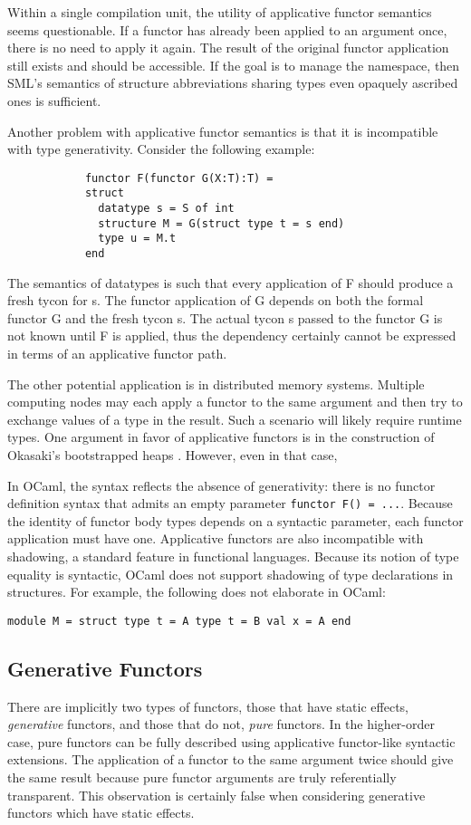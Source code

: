 Within a single compilation unit, the utility of applicative functor semantics seems questionable. If a functor has already been applied to an argument once, there is no need to apply it again. The result of the original functor application still exists and should be accessible. If the goal is to manage the namespace, then SML's semantics of structure abbreviations sharing types even opaquely ascribed ones is sufficient.  

Another problem with applicative functor semantics is that it is incompatible with type generativity. Consider the following example:

			\begin{lstlisting}
			functor F(functor G(X:T):T) = 
			struct 
			  datatype s = S of int 
			  structure M = G(struct type t = s end)
			  type u = M.t
			end	
			\end{lstlisting}

The semantics of datatypes is such that every application of F should produce a fresh tycon for s. The functor application of G depends on both the formal functor G and the fresh tycon s. The actual tycon s passed to the functor G is not known until F is applied, thus the dependency certainly cannot be expressed in terms of an applicative functor path. 

The other potential application is in distributed memory systems. Multiple computing nodes may each apply a functor to the same argument and then try to exchange values of a type in the result. Such a scenario will likely require runtime types. One argument in favor of applicative functors is in the construction of Okasaki's bootstrapped heaps \cite{okasaki}. However, even in that case, 

In OCaml, the syntax reflects the absence of generativity: there is no functor definition syntax that admits an empty parameter \lstinline{functor F() = ...}. Because the identity of functor body types depends on a syntactic parameter, each functor application must have one. Applicative functors are also incompatible with shadowing, a standard feature in functional languages. Because its notion of type equality is syntactic, OCaml does not support shadowing of type declarations in structures. For example, the following does not elaborate in OCaml:

\begin{lstlisting}
module M = struct type t = A type t = B val x = A end
\end{lstlisting}

\subsection{Generative Functors}\label{sec:ftgf}
There are implicitly two types of functors, those that have static effects, \emph{generative} functors, and those that do not, \emph{pure} functors. In the higher-order case, pure functors can be fully described using applicative functor-like syntactic extensions. The application of a functor to the same argument twice should give the same result because pure functor arguments are truly referentially transparent. This observation is certainly false when considering generative functors which have static effects. 

